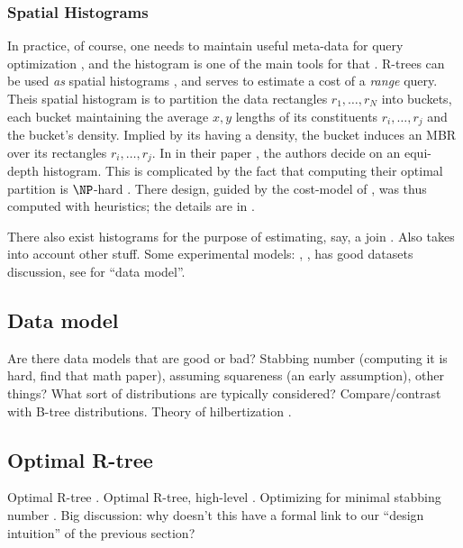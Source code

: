 \subsubsection{Spatial Histograms}
In practice, of course, one needs to maintain useful meta-data for query optimization \cite{chaudhuri98}, and the histogram is one of the main tools for that \cite{poosalahaasioannidisshekita96}.
R-trees can be used \emph{as} spatial histograms \cite{achakeevseeger12}, and serves to estimate a cost of a \emph{range} query.
Theis spatial histogram is to partition the data rectangles $r_1,\ldots,r_N$ into buckets, each bucket maintaining the average $x,y$ lengths of its constituents $r_i,\ldots,r_j$ and the bucket's density.
Implied by its having a density, the bucket induces an MBR over its rectangles $r_i,\ldots,r_j$.
In in their paper \cite{achakeevseeger12}, the authors decide on an equi-depth histogram.
This is complicated by the fact that computing their optimal partition is $\NP$-hard \cite{muthukrishnanpoosalasuel99}.
There design, guided by the cost-model of \cite{theodoridissellis96}, was thus computed with heuristics; the details are in \cite{achakeevseeger12a}.

There also exist histograms for the purpose of estimating, say, a join \cite{aboulnaganaughton00}.
Also takes into account other stuff.
Some experimental models: \cite{aboulnaganaughton00}, \cite{anyangsivasubramaniam01}, \cite{achakeevseeger12,achakeevseeger12a} has good datasets discussion, see for ``data model''.

\subsection{Data model}
Are there data models that are good or bad? Stabbing number (computing it is hard, find that math paper), assuming squareness (an early assumption), other things?
What sort of distributions are typically considered?
Compare/contrast with B-tree distributions.
Theory of hilbertization \cite{haverkortwalderveen11}.

\subsection{Optimal R-tree}
Optimal R-tree \cite{argeberghaverkortyi04}.
Optimal R-tree, high-level \cite{yi12}.
Optimizing for minimal stabbing number \cite{bergkhosraviverdonschotweele11}.
Big discussion: why doesn't this have a formal link to our ``design intuition'' of the previous section?
